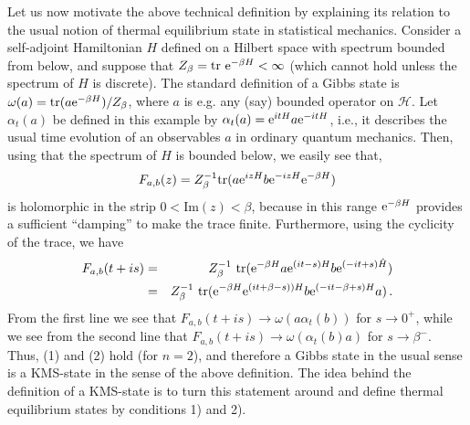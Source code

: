 \documentclass[12pt]{article}
\newcommand{\eH}{\mathscr{H}}
\renewcommand{\Im}{\mathrm{Im}}
\newcommand{\e}{{\rm e}}
\theoremstyle{plain}
\theoremstyle{definition}
\def\ben{\begin{equation}}
\def\een{\end{equation}}
\def\bena{\begin{eqnarray}}
\def\eena{\end{eqnarray}}
\begin{document}
Let us now motivate the above technical definition by explaining
its relation to the usual notion of thermal
equilibrium state in statistical mechanics. Consider a self-adjoint Hamiltonian $H$
defined on a Hilbert space with spectrum bounded from below, and
suppose that $Z_\beta = {\rm tr} \ \e^{-\beta H} < \infty$ (which cannot hold 
unless the spectrum of $H$ is discrete). The
standard definition of a Gibbs state is
$\omega ( a ) = {\rm tr} (a \e^{-\beta H})/Z_\beta$,
 where $a$ is e.g. any (say) bounded
operator on $\eH$. Let $\alpha_t(a)$ be defined in this example by
$\alpha_t(a)=\e^{itH} a \e^{-itH}$, i.e., it
describes
the usual time evolution of an observables $a$
in ordinary quantum mechanics. Then, using
that the spectrum of $H$ is
bounded below, we easily see that,
\ben
F_{a,b}(z) =
Z_\beta^{-1} {\rm tr} (a \e^{iz H} b \e^{-iz H}\e^{-\beta H} )
\een
is holomorphic in the strip $0 < \Im(z) < \beta$, because in this range $\e^{-\beta H}$ 
 provides a sufficient ``damping''  to make the trace finite. Furthermore, using
the cyclicity of the trace, we have
\bena
F_{a,b}(t+is) &=&
Z_\beta^{-1} \
{\rm tr} (\e^{-\beta H} a \e^{(it-s) H} b \e^{(-it+s)
  \hat H} ) \\
&=&
Z_\beta^{-1} \
{\rm tr} (\e^{-\beta H} \e^{(it+\beta-s)) H} b
\e^{(-it-\beta+s)
  H} a) \, .
\eena
From the first line we see
that  $F_{a,b}(t+is) \to
\omega(a \alpha_t(b))$ for $s\to 0^+$,
while we see from the second line that $F_{a,b}(t+is) \to
\omega(\alpha_t(b) a)$ for $s\to \beta^-$. Thus, (1) and (2) hold (for $n=2$), and 
therefore a Gibbs state in the usual sense is a
KMS-state in the sense of the above definition. The
idea behind the definition of a KMS-state is to turn this statement
around and define thermal equilibrium states by conditions 1) and 2).
\end{document}

